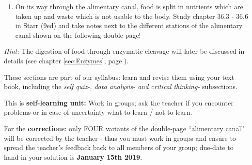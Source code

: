 \begin{enumerate}[resume, leftmargin=*]
		
		\item On its way through the alimentary canal, food is split in nutrients which are taken up and waste which is not usable to the body. Study chapter 36.3 - 36.6 in Starr (9ed) and take notes next to the different stations of the alimentary canal shown on the following double-page!
		\end{enumerate}

\emph{Hint:} The digestion of food through enzymatic cleavage will later be discussed in details (see chapter \ref{sec:Enzymes}, page \pageref{sec:Enzymes}).

		\vspace{1cm}
		\begin{mdframed}[style=exampledefault, userdefinedwidth=12cm, frametitle={Starr 36.3 \& 36.4 \& 36.5 \& 36.6}\label{mat:BEISPIELMATERIAL}]	  
			These sections are part of our syllabus: learn and revise them using your text book,  including the \textit{self quiz-, data analysis- and critical thinking-} subsections.
		\end{mdframed}



\hfill
\begin{mdframed}[style=RedGray]
This is \textbf{self-learning unit:} Work in groups; ask the teacher if you encounter problems or in case of uncertainty what to learn / not to learn.

For the \textbf{correction}s: only FOUR variants of the double-page "`alimentary canal"' will be corrected by the teacher - thus you must work in groups and ensure to spread the teacher's feedback back to all members of your group; due-date to hand in your solution is \textbf{January 15th 2019}.
\end{mdframed}
\hfill

